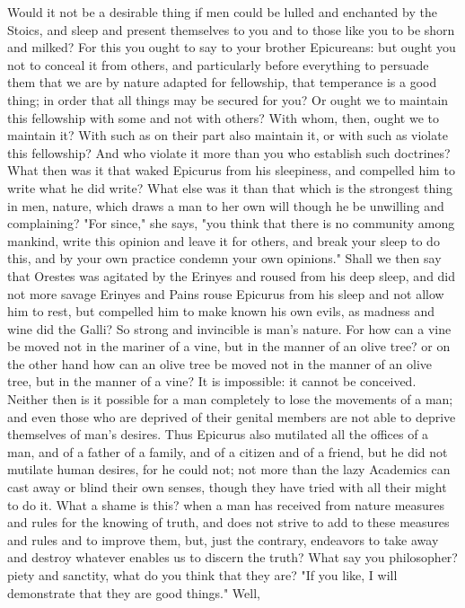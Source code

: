 \documentclass[a4paper]{article}
\begin{document}
Would it not be a desirable thing if men could be lulled and enchanted by the
Stoics, and sleep and present themselves to you and to those like you to be
shorn and milked? For this you ought to say to your brother Epicureans: but
ought you not to conceal it from others, and particularly before everything to
persuade them that we are by nature adapted for fellowship, that temperance is
a good thing; in order that all things may be secured for you? Or ought we to
maintain this fellowship with some and not with others? With whom, then, ought
we to maintain it? With such as on their part also maintain it, or with such as
violate this fellowship? And who violate it more than you who establish such
doctrines?
    What then was it that waked Epicurus from his sleepiness, and compelled him
to write what he did write? What else was it than that which is the strongest
thing in men, nature, which draws a man to her own will though he be unwilling
and complaining? "For since," she says, "you think that there is no community
among mankind, write this opinion and leave it for others, and break your sleep
to do this, and by your own practice condemn your own opinions." Shall we then
say that Orestes was agitated by the Erinyes and roused from his deep sleep,
and did not more savage Erinyes and Pains rouse Epicurus from his sleep and not
allow him to rest, but compelled him to make known his own evils, as madness
and wine did the Galli? So strong and invincible is man's nature. For how can a
vine be moved not in the mariner of a vine, but in the manner of an olive tree?
or on the other hand how can an olive tree be moved not in the manner of an
olive tree, but in the manner of a vine? It is impossible: it cannot be
conceived. Neither then is it possible for a man completely to lose the
movements of a man; and even those who are deprived of their genital members
are not able to deprive themselves of man's desires. Thus Epicurus also
mutilated all the offices of a man, and of a father of a family, and of a
citizen and of a friend, but he did not mutilate human desires, for he could
not; not more than the lazy Academics can cast away or blind their own senses,
though they have tried with all their might to do it. What a shame is this?
when a man has received from nature measures and rules for the knowing of
truth, and does not strive to add to these measures and rules and to improve
them, but, just the contrary, endeavors to take away and destroy whatever
enables us to discern the truth?
    What say you philosopher? piety and sanctity, what do you think that they
are? "If you like, I will demonstrate that they are good things." Well,
\end{document}
